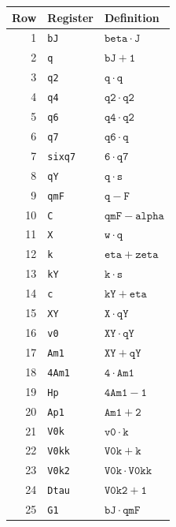 \begingroup\fontsize{8.5}{10.5}\selectfont
\begin{longtable}{rll}
\toprule
Row & Register & Definition\\
\midrule\endhead
1 & \texttt{bJ} & $\mathtt{beta} \mathbin{\cdot} \mathtt{J}$ \\
2 & \texttt{q} & $\mathtt{bJ} + \mathtt{1}$ \\
3 & \texttt{q2} & $\mathtt{q} \mathbin{\cdot} \mathtt{q}$ \\
4 & \texttt{q4} & $\mathtt{q2} \mathbin{\cdot} \mathtt{q2}$ \\
5 & \texttt{q6} & $\mathtt{q4} \mathbin{\cdot} \mathtt{q2}$ \\
6 & \texttt{q7} & $\mathtt{q6} \mathbin{\cdot} \mathtt{q}$ \\
7 & \texttt{sixq7} & $\mathtt{6} \mathbin{\cdot} \mathtt{q7}$ \\
8 & \texttt{qY} & $\mathtt{q} \mathbin{\cdot} \mathtt{s}$ \\
9 & \texttt{qmF} & $\mathtt{q} - \mathtt{F}$ \\
10 & \texttt{C} & $\mathtt{qmF} - \mathtt{alpha}$ \\
11 & \texttt{X} & $\mathtt{w} \mathbin{\cdot} \mathtt{q}$ \\
12 & \texttt{k} & $\mathtt{eta} + \mathtt{zeta}$ \\
13 & \texttt{kY} & $\mathtt{k} \mathbin{\cdot} \mathtt{s}$ \\
14 & \texttt{c} & $\mathtt{kY} + \mathtt{eta}$ \\
15 & \texttt{XY} & $\mathtt{X} \mathbin{\cdot} \mathtt{qY}$ \\
16 & \texttt{v0} & $\mathtt{XY} \mathbin{\cdot} \mathtt{qY}$ \\
17 & \texttt{Am1} & $\mathtt{XY} + \mathtt{qY}$ \\
18 & \texttt{4Am1} & $\mathtt{4} \mathbin{\cdot} \mathtt{Am1}$ \\
19 & \texttt{Hp} & $\mathtt{4Am1} - \mathtt{1}$ \\
20 & \texttt{Ap1} & $\mathtt{Am1} + \mathtt{2}$ \\
21 & \texttt{V0k} & $\mathtt{v0} \mathbin{\cdot} \mathtt{k}$ \\
22 & \texttt{V0kk} & $\mathtt{V0k} + \mathtt{k}$ \\
23 & \texttt{V0k2} & $\mathtt{V0k} \mathbin{\cdot} \mathtt{V0kk}$ \\
24 & \texttt{Dtau} & $\mathtt{V0k2} + \mathtt{1}$ \\
25 & \texttt{G1} & $\mathtt{bJ} \mathbin{\cdot} \mathtt{qmF}$ \\

\end{longtable}

